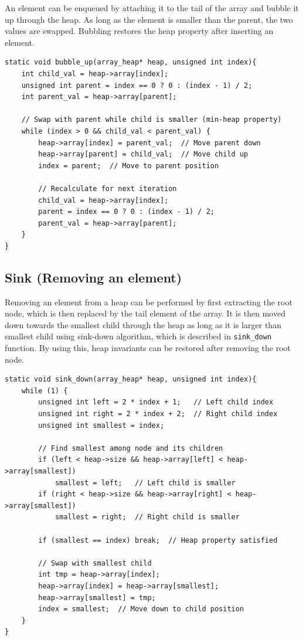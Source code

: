 \documentclass[a4paper,11pt]{article}
\begin{document}
An element can be enqueued by attaching it to the tail of the array and bubble it up through the heap. As long as the element is smaller than the parent, the two values are swapped. Bubbling restores the heap property after inserting an element.

\begin{verbatim}
static void bubble_up(array_heap* heap, unsigned int index){
    int child_val = heap->array[index];
    unsigned int parent = index == 0 ? 0 : (index - 1) / 2;
    int parent_val = heap->array[parent];
    
    // Swap with parent while child is smaller (min-heap property)
    while (index > 0 && child_val < parent_val) {
        heap->array[index] = parent_val;  // Move parent down
        heap->array[parent] = child_val;  // Move child up
        index = parent;  // Move to parent position

        // Recalculate for next iteration
        child_val = heap->array[index];
        parent = index == 0 ? 0 : (index - 1) / 2;
        parent_val = heap->array[parent];
    }
}
\end{verbatim}

\subsection*{Sink (Removing an element)}

Removing an element from a heap can be performed by first extracting the root node, which is then replaced by the tail element of the array. It is then moved down towards the smallest child through the heap as long as it is larger than smallest child using sink-down algorithm, which is described in \texttt{sink\_down} function. By using this, heap invariants can be restored after removing the root node.

\begin{verbatim}
static void sink_down(array_heap* heap, unsigned int index){
    while (1) {
        unsigned int left = 2 * index + 1;   // Left child index
        unsigned int right = 2 * index + 2;  // Right child index
        unsigned int smallest = index;
        
        // Find smallest among node and its children
        if (left < heap->size && heap->array[left] < heap->array[smallest])
            smallest = left;   // Left child is smaller
        if (right < heap->size && heap->array[right] < heap->array[smallest])
            smallest = right;  // Right child is smaller

        if (smallest == index) break;  // Heap property satisfied
        
        // Swap with smallest child
        int tmp = heap->array[index];
        heap->array[index] = heap->array[smallest];
        heap->array[smallest] = tmp;
        index = smallest;  // Move down to child position
    }
}
\end{verbatim}
\end{document}
